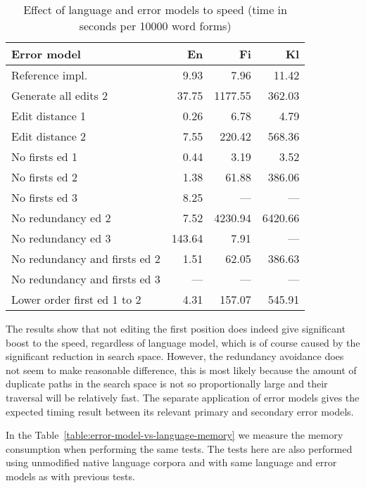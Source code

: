 \documentclass[11pt]{article}
\begin{document}
\begin{table}[h]
\begin{center}
\begin{scriptsize}
\begin{tabular}{|l|rrr|}
\hline
\bf Error model & \bf En & \bf Fi & \bf Kl \\ 
\hline
Reference impl. &
9.93&7.96&11.42
\\
Generate all edits 2 & 
37.75&1177.55&362.03
\\
\hline
Edit distance 1 &
0.26&6.78&4.79
\\
Edit distance 2 &
7.55&220.42&568.36
\\
No firsts ed 1 & 
0.44&3.19&3.52
\\
No firsts ed 2 &
1.38&61.88&386.06
\\
No firsts ed 3 &
8.25&---&---
\\
No redundancy ed 2 &
7.52&4230.94&6420.66
\\
No redundancy ed 3 &
143.64&7.91&---
\\
No redundancy and firsts ed 2 &
1.51&62.05&386.63
\\
No redundancy and firsts ed 3 &
---&---&---
\\
Lower order first ed 1 to 2 &
4.31&157.07&545.91
\\
\end{tabular}
\end{scriptsize}
\end{center}
\caption{\label{table:error-model-vs-language-speed} Effect of language and 
error models to speed (time in seconds per 10000 word forms)}
\end{table}

The results show that not editing the first position does indeed give
significant boost to the speed, regardless of language model, which is of course
caused by the significant reduction in search space. However, the
redundancy avoidance does not seem to make reasonable difference, this is most
likely because the amount of duplicate paths in the search space is not so
proportionally large and their traversal will be relatively fast. The separate
application of error models gives the expected timing result between its
relevant primary and secondary error models.

In the Table~\ref{table:error-model-vs-language-memory} we measure the memory
consumption when performing the same tests. The tests here are also performed
using unmodified native language corpora and with same language and error
models as with previous tests.
\end{document}
